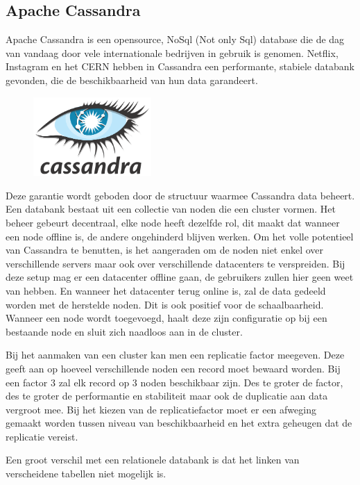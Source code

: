 \documentclass{article}
\begin{document}
	\subsection{Apache Cassandra}
	Apache Cassandra is een opensource, NoSql (Not only Sql) database die de dag van vandaag door vele internationale bedrijven 
	in gebruik is genomen. 
	Netflix, Instagram en het CERN hebben in Cassandra een performante, stabiele databank gevonden, 
	die de beschikbaarheid van hun data garandeert.
	\par
	\begin{figure}
  		\includegraphics[width=0.4\textwidth]{images/cassandra.png}
	\end{figure}
	Deze garantie wordt geboden door de structuur waarmee Cassandra data beheert. 
	Een databank bestaat uit een collectie van noden die een cluster vormen. 
	Het beheer gebeurt decentraal, elke node heeft dezelfde rol, 
	dit maakt dat wanneer een node offline is, de andere ongehinderd blijven werken. 
	Om het volle potentieel van Cassandra te benutten, is het aangeraden om de noden niet enkel over verschillende servers 
	maar ook over verschillende datacenters te verspreiden. 
	Bij deze setup mag er een datacenter offline gaan, de gebruikers zullen hier geen weet van hebben.  
	En wanneer het datacenter terug online is, zal de data gedeeld worden met de herstelde noden.
	Dit is ook positief voor de schaalbaarheid. 
	Wanneer een node wordt toegevoegd, haalt deze zijn configuratie op bij een bestaande node en sluit zich naadloos aan in de cluster.
	\par
	Bij het aanmaken van een cluster kan men een replicatie factor meegeven. 
	Deze geeft aan op hoeveel verschillende noden een record moet bewaard worden. 
	Bij een factor 3 zal elk record op 3 noden beschikbaar zijn. 
	Des te groter de factor, des te groter de performantie en stabiliteit maar ook de duplicatie aan data vergroot mee.
	Bij het kiezen van de replicatiefactor moet er een afweging gemaakt worden tussen niveau van beschikbaarheid en
	het extra geheugen dat de replicatie vereist.
	\par
	Een groot verschil met een relationele databank is dat het linken van verscheidene tabellen niet mogelijk is.
\end{document}
